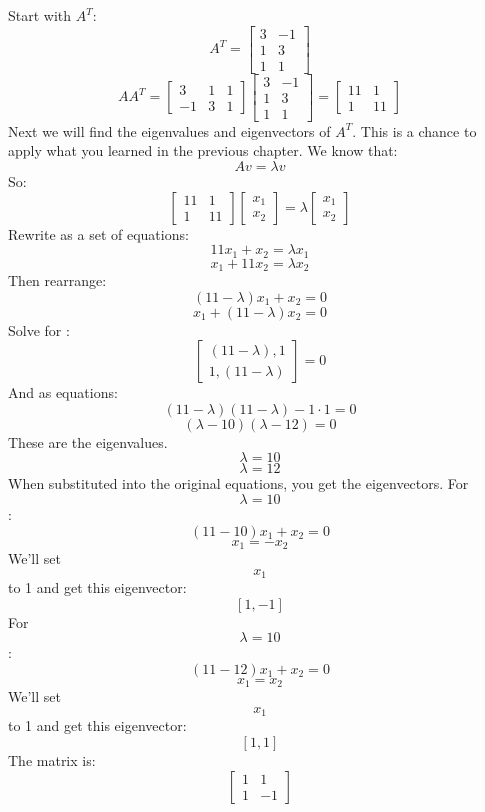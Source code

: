 Start with $A^T$:
$$ A^T = \begin{bmatrix}
3 & -1\\
1 & 3 \\
1 & 1 
\end{bmatrix}$$
$$AA^T = \begin{bmatrix}
3 & 1 & 1\\
 -1 & 3 & 1
\end{bmatrix}
\begin{bmatrix}
3 & -1\\
1 & 3\\
1 & 1
\end{bmatrix}
= \begin{bmatrix}
11 & 1\\
 1 & 11 
\end{bmatrix}
$$
Next we will find the eigenvalues and eigenvectors of $A^T$. This is a chance to apply what you learned in the previous chapter. We know that:
\begin{equation}
Av = \lambda v
\end{equation}
So:
$$
\begin{bmatrix}
11 & 1 \\
 1 & 11  
\end{bmatrix}
\begin{bmatrix}
x_1  \\
x_2 
\end{bmatrix}
=
\lambda 
\begin{bmatrix}
x_1   \\
x_2 
\end{bmatrix}
$$
Rewrite as a set of equations:
$$11x_1 + x_2 = \lambda x_1$$
$$x_1 + 11x_2 = \lambda x_2$$
Then rearrange:
$$(11−\lambda )x_1 +x_2 =0$$
$$x_1 +(11−\lambda )x_2 =0 $$
Solve for \lambda :
$$\begin{bmatrix}
(11 -\lambda), 1 \\
 1, (11 -\lambda) 
\end{bmatrix} = 0$$
And as equations:
$$(11 − \lambda)(11 − \lambda) − 1 · 1 = 0$$
$$(\lambda − 10)(\lambda − 12) = 0$$
These are the eigenvalues.
$$\lambda = 10$$
$$\lambda = 12$$
When substituted into the original equations, you get the eigenvectors. For $$ \lambda = 10$$:
$$(11−10)x_1 +x_2 =0 $$
$$x_1 = -x_2$$
We'll set $$x_1$$ to 1 and get this eigenvector:
$$\left[ 1,-1 \right]$$
For $$ \lambda = 10$$:
$$(11−12)x_1 +x_2 =0  $$
$$x_1 = x_2 $$
We'll set $$x_1$$ to 1 and get this eigenvector:
$$\left[ 1,1 \right]$$
The matrix is:
$$
\begin{bmatrix}
1 & 1 \\
1 & -1 
\end{bmatrix}
$$
